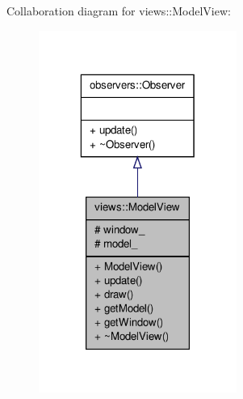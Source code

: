 \-Collaboration diagram for views\-:\-:\-Model\-View\-:
\nopagebreak
\begin{figure}[H]
\begin{center}
\leavevmode
\includegraphics[width=184pt]{d1/da0/classviews_1_1ModelView__coll__graph}
\end{center}
\end{figure}
